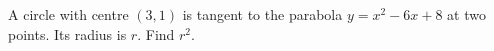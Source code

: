 A circle with centre $(3,1)$ is tangent to the parabola $y=x^2-6x+8$ at two points. Its radius is $r$. Find $r^2$.
